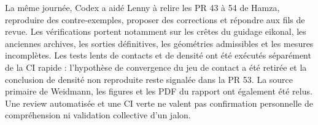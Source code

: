 La même journée, Codex a aidé Lenny à relire les PR 43 à 54 de Hamza,
reproduire des contre-exemples, proposer des corrections et répondre aux fils de revue.
Les vérifications portent notamment sur les crêtes du guidage eikonal, les anciennes
archives, les sorties définitives, les géométries admissibles et les mesures incomplètes.
Les tests lents de contacts et de densité ont été exécutés séparément de la CI rapide :
l'hypothèse de convergence du jeu de contact a été retirée et la conclusion de densité
non reproduite reste signalée dans la PR 53. La source primaire de Weidmann, les figures
et les PDF du rapport ont également été relus. Une review automatisée et une CI verte
ne valent pas confirmation personnelle de compréhension ni validation collective d'un jalon.
